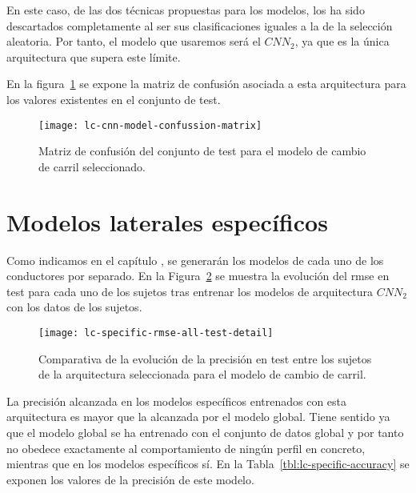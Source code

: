 En este caso, de las dos técnicas propuestas para los modelos, los  ha sido descartados completamente al ser sus clasificaciones iguales a la de la selección aleatoria. Por tanto, el modelo que usaremos será el $CNN_2$, ya que es la única arquitectura que supera este límite.

En la figura~\ref{fig:lc-cnn-model-confussion-matrix} se expone la matriz de confusión asociada a esta arquitectura para los valores existentes en el conjunto de test.

\begin{figure}
	\centering
	\texttt{[image: lc-cnn-model-confussion-matrix]}
	\caption[Matriz de confusión del conjunto de test para el modelo de cambio de carril seleccionado]{Matriz de confusión del conjunto de test para el modelo de cambio de carril seleccionado.}
	\label{fig:lc-cnn-model-confussion-matrix}
\end{figure}

\section{Modelos laterales específicos}

Como indicamos en el capítulo , se generarán los modelos de cada uno de los conductores por separado. 
En la Figura~\ref{fig:lc-specific-rmse-all-test-detail} se muestra la evolución del \gls{rmse} en test para cada uno de los sujetos tras entrenar los modelos de arquitectura $CNN_2$ con los datos de los sujetos.

\begin{figure}
	\centering
	\texttt{[image: lc-specific-rmse-all-test-detail]}
	\caption[\gls{rmse} en test entre los sujetos de la arquitectura seleccionada para el modelo de cambio de carril]{Comparativa de la evolución de la precisión en test entre los sujetos de la arquitectura seleccionada para el modelo de cambio de carril.}
	\label{fig:lc-specific-rmse-all-test-detail}
\end{figure}

La precisión alcanzada en los modelos específicos entrenados con esta arquitectura es mayor que la alcanzada por el modelo global. Tiene sentido ya que el modelo global se ha entrenado con el conjunto de datos global y por tanto no obedece exactamente al comportamiento de ningún perfil en concreto, mientras que en los modelos específicos sí. En la Tabla~\ref{tbl:lc-specific-accuracy} se exponen los valores de la precisión de este modelo.

